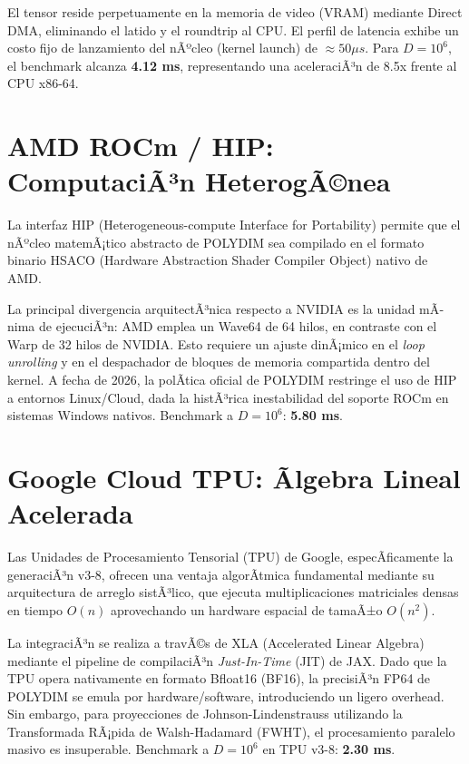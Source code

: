 El tensor reside perpetuamente en la memoria de video (VRAM) mediante Direct DMA, eliminando el latido y el roundtrip al CPU. El perfil de latencia exhibe un costo fijo de lanzamiento del nÃºcleo (kernel launch) de \(\approx 50 \mu s\). Para \(D=10^6\), el benchmark alcanza \textbf{4.12 ms}, representando una aceleraciÃ³n de 8.5x frente al CPU x86-64.

\section{AMD ROCm / HIP: ComputaciÃ³n HeterogÃ©nea}
\label{sec:amd_rocm_hip}

La interfaz HIP (Heterogeneous-compute Interface for Portability) permite que el nÃºcleo matemÃ¡tico abstracto de POLYDIM sea compilado en el formato binario HSACO (Hardware Abstraction Shader Compiler Object) nativo de AMD. 

La principal divergencia arquitectÃ³nica respecto a NVIDIA es la unidad mÃ­nima de ejecuciÃ³n: AMD emplea un Wave64 de 64 hilos, en contraste con el Warp de 32 hilos de NVIDIA. Esto requiere un ajuste dinÃ¡mico en el \textit{loop unrolling} y en el despachador de bloques de memoria compartida dentro del kernel.
A fecha de 2026, la polÃ­tica oficial de POLYDIM restringe el uso de HIP a entornos Linux/Cloud, dada la histÃ³rica inestabilidad del soporte ROCm en sistemas Windows nativos.
Benchmark a \(D=10^6\): \textbf{5.80 ms}.

\section{Google Cloud TPU: Ãlgebra Lineal Acelerada}
\label{sec:tpu_xla}

Las Unidades de Procesamiento Tensorial (TPU) de Google, especÃ­ficamente la generaciÃ³n v3-8, ofrecen una ventaja algorÃ­tmica fundamental mediante su arquitectura de arreglo sistÃ³lico, que ejecuta multiplicaciones matriciales densas en tiempo \(O(n)\) aprovechando un hardware espacial de tamaÃ±o \(O(n^2)\).

La integraciÃ³n se realiza a travÃ©s de XLA (Accelerated Linear Algebra) mediante el pipeline de compilaciÃ³n \textit{Just-In-Time} (JIT) de JAX. Dado que la TPU opera nativamente en formato Bfloat16 (BF16), la precisiÃ³n FP64 de POLYDIM se emula por hardware/software, introduciendo un ligero overhead. Sin embargo, para proyecciones de Johnson-Lindenstrauss utilizando la Transformada RÃ¡pida de Walsh-Hadamard (FWHT), el procesamiento paralelo masivo es insuperable.
Benchmark a \(D=10^6\) en TPU v3-8: \textbf{2.30 ms}.

